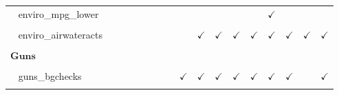 \documentclass[
  12pt]{article}
\begin{document}
\begin{table}[H]
{\begin{tabular}{lcccccccccccccccc}
$\hspace{10pt}$enviro\_mpg\_lower &  &  &  &  &  &  &  &  &  &  &  &  & $\checkmark$ &  &  & \\
\cellcolor{gray!6}{$\hspace{10pt}$enviro\_renewable} & \cellcolor{gray!6}{} & \cellcolor{gray!6}{} & \cellcolor{gray!6}{} & \cellcolor{gray!6}{} & \cellcolor{gray!6}{} & \cellcolor{gray!6}{} & \cellcolor{gray!6}{} & \cellcolor{gray!6}{} & \cellcolor{gray!6}{$\checkmark$} & \cellcolor{gray!6}{$\checkmark$} & \cellcolor{gray!6}{$\checkmark$} & \cellcolor{gray!6}{$\checkmark$} & \cellcolor{gray!6}{$\checkmark$} & \cellcolor{gray!6}{$\checkmark$} & \cellcolor{gray!6}{$\checkmark$} & \cellcolor{gray!6}{$\checkmark$}\\
$\hspace{10pt}$enviro\_airwateracts &  &  &  &  &  &  &  &  & $\checkmark$ & $\checkmark$ & $\checkmark$ & $\checkmark$ & $\checkmark$ & $\checkmark$ & $\checkmark$ & $\checkmark$\\
\cellcolor{gray!6}{$\hspace{10pt}$enviro\_vs\_jobs} & \cellcolor{gray!6}{$\checkmark$} & \cellcolor{gray!6}{$\checkmark$} & \cellcolor{gray!6}{$\checkmark$} & \cellcolor{gray!6}{} & \cellcolor{gray!6}{$\checkmark$} & \cellcolor{gray!6}{} & \cellcolor{gray!6}{$\checkmark$} & \cellcolor{gray!6}{$\checkmark$} & \cellcolor{gray!6}{} & \cellcolor{gray!6}{} & \cellcolor{gray!6}{} & \cellcolor{gray!6}{} & \cellcolor{gray!6}{} & \cellcolor{gray!6}{} & \cellcolor{gray!6}{} & \cellcolor{gray!6}{}\\
$\textbf{Guns}$ &  &  &  &  &  &  &  &  &  &  &  &  &  &  &  & \\
\cellcolor{gray!6}{$\hspace{10pt}$guns\_scale} & \cellcolor{gray!6}{} & \cellcolor{gray!6}{} & \cellcolor{gray!6}{} & \cellcolor{gray!6}{} & \cellcolor{gray!6}{$\checkmark$} & \cellcolor{gray!6}{} & \cellcolor{gray!6}{$\checkmark$} & \cellcolor{gray!6}{} & \cellcolor{gray!6}{} & \cellcolor{gray!6}{} & \cellcolor{gray!6}{} & \cellcolor{gray!6}{} & \cellcolor{gray!6}{} & \cellcolor{gray!6}{} & \cellcolor{gray!6}{} & \cellcolor{gray!6}{}\\
$\hspace{10pt}$guns\_bgchecks &  &  &  &  &  &  &  & $\checkmark$ & $\checkmark$ & $\checkmark$ & $\checkmark$ & $\checkmark$ & $\checkmark$ & $\checkmark$ &  & $\checkmark$\\
\cellcolor{gray!6}{$\hspace{10pt}$guns\_names} & \cellcolor{gray!6}{} & \cellcolor{gray!6}{} & \cellcolor{gray!6}{} & \cellcolor{gray!6}{} & \cellcolor{gray!6}{} & \cellcolor{gray!6}{} & \cellcolor{gray!6}{} & \cellcolor{gray!6}{$\checkmark$} & \cellcolor{gray!6}{$\checkmark$} & \cellcolor{gray!6}{$\checkmark$} & \cellcolor{gray!6}{$\checkmark$} & \cellcolor{gray!6}{$\checkmark$} & \cellcolor{gray!6}{} & \cellcolor{gray!6}{} & \cellcolor{gray!6}{$\checkmark$} & \cellcolor{gray!6}{}\\

\end{tabular}}
\end{table}
\end{document}
